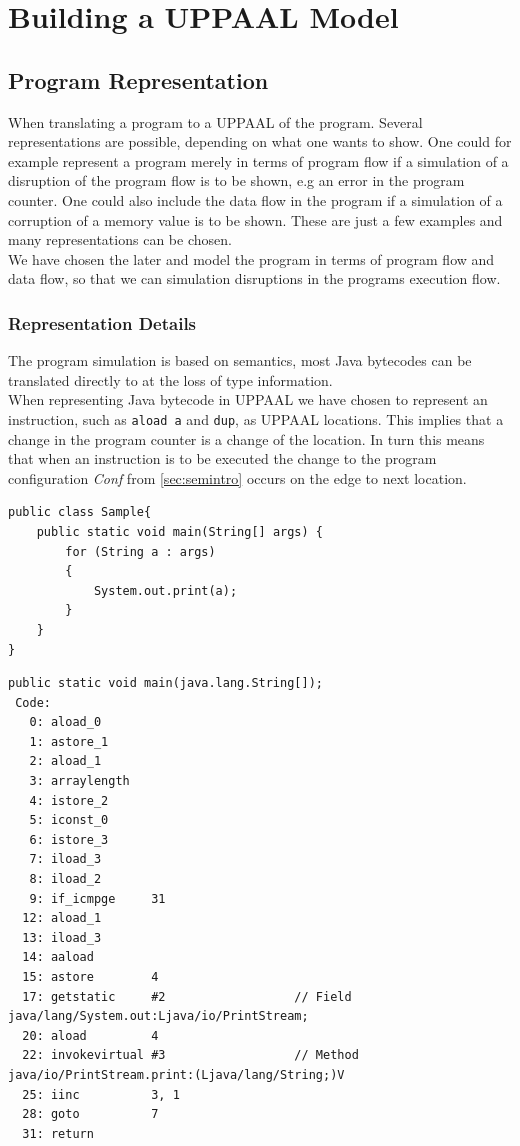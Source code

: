 \chapter{Building a UPPAAL Model}
\section{Program Representation}
When translating a program to a UPPAAL of the program. Several representations are possible, depending on what one wants to show. One could for example represent a program merely in terms of program flow if a simulation of a disruption of the program flow is to be shown, e.g an error in the program counter. One could also include the data flow in the program if a simulation of a corruption of a memory value is to be shown. These are just a few examples and many representations can be chosen.\\

We have chosen the later and model the program in terms of program flow and data flow, so that we can simulation disruptions in the programs execution flow. 


\subsection{Representation Details}
The program simulation is based on \jcl semantics, most Java bytecodes can be translated directly to \jcl at the loss of type information.\\
When representing Java bytecode in UPPAAL we have chosen to represent an instruction, such as \texttt{aload a} and \texttt{dup}, as UPPAAL locations. 
This implies that a change in the program counter is a change of the location. 
In turn this means that when an instruction is to be executed the change to the program configuration \textit{Conf} from  \cref{sec:semintro} occurs on the edge to next location.

\begin{lstlisting}[caption=Jave code sample.]
public class Sample{
    public static void main(String[] args) {
        for (String a : args)         
        {
            System.out.print(a);
        }
    }
}
\end{lstlisting}

\begin{lstlisting}[caption=Bytecode sample.]
public static void main(java.lang.String[]);
 Code:
   0: aload_0       
   1: astore_1      
   2: aload_1       
   3: arraylength   
   4: istore_2      
   5: iconst_0      
   6: istore_3      
   7: iload_3       
   8: iload_2       
   9: if_icmpge     31
  12: aload_1       
  13: iload_3       
  14: aaload        
  15: astore        4
  17: getstatic     #2                  // Field java/lang/System.out:Ljava/io/PrintStream;
  20: aload         4
  22: invokevirtual #3                  // Method java/io/PrintStream.print:(Ljava/lang/String;)V
  25: iinc          3, 1
  28: goto          7
  31: return        

\end{lstlisting}

